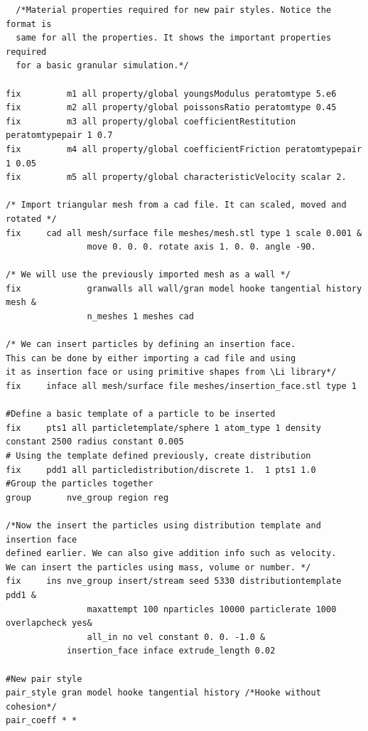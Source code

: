 \documentclass{tufte-book} %
\newcommand{\Li}{\textit{LIGGGHTS}\xspace}
\begin{document}
\begin{verbatim}
  /*Material properties required for new pair styles. Notice the format is
  same for all the properties. It shows the important properties required
  for a basic granular simulation.*/

fix 		m1 all property/global youngsModulus peratomtype 5.e6
fix 		m2 all property/global poissonsRatio peratomtype 0.45
fix 		m3 all property/global coefficientRestitution peratomtypepair 1 0.7
fix 		m4 all property/global coefficientFriction peratomtypepair 1 0.05
fix 		m5 all property/global characteristicVelocity scalar 2.

/* Import triangular mesh from a cad file. It can scaled, moved and rotated */
fix		cad all mesh/surface file meshes/mesh.stl type 1 scale 0.001 &
                move 0. 0. 0. rotate axis 1. 0. 0. angle -90.

/* We will use the previously imported mesh as a wall */
fix             granwalls all wall/gran model hooke tangential history mesh &
                n_meshes 1 meshes cad

/* We can insert particles by defining an insertion face.
This can be done by either importing a cad file and using
it as insertion face or using primitive shapes from \Li library*/
fix		inface all mesh/surface file meshes/insertion_face.stl type 1

#Define a basic template of a particle to be inserted
fix		pts1 all particletemplate/sphere 1 atom_type 1 density constant 2500 radius constant 0.005
# Using the template defined previously, create distribution
fix		pdd1 all particledistribution/discrete 1.  1 pts1 1.0
#Group the particles together
group		nve_group region reg

/*Now the insert the particles using distribution template and insertion face
defined earlier. We can also give addition info such as velocity.
We can insert the particles using mass, volume or number. */
fix		ins nve_group insert/stream seed 5330 distributiontemplate pdd1 &
                maxattempt 100 nparticles 10000 particlerate 1000 overlapcheck yes&
                all_in no vel constant 0. 0. -1.0 &
	        insertion_face inface extrude_length 0.02

#New pair style
pair_style gran model hooke tangential history /*Hooke without cohesion*/
pair_coeff * *
\end{verbatim}
\end{document}
